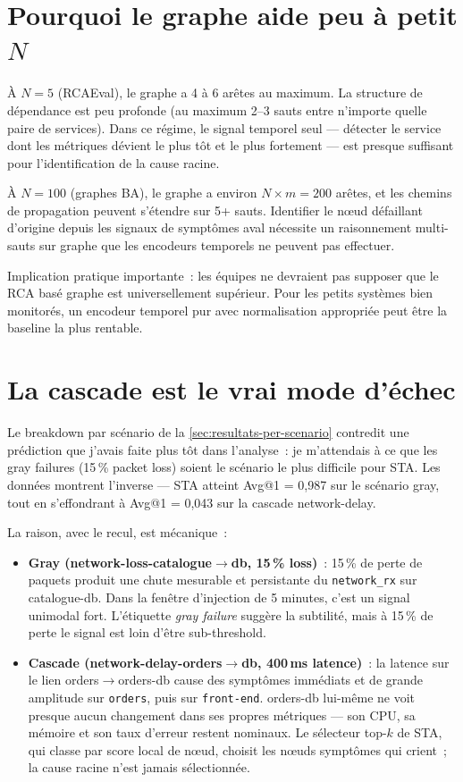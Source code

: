 \documentclass[a4paper,11pt,oneside]{report}
\begin{document}
\section{Pourquoi le graphe aide peu \`a petit $N$}
\label{sec:disc-graphe}

\`A $N{=}5$ (RCAEval), le graphe a 4 \`a 6 ar\^etes au maximum. La structure de d\'ependance est peu profonde (au maximum 2--3 sauts entre n'importe quelle paire de services). Dans ce r\'egime, le signal temporel seul --- d\'etecter le service dont les m\'etriques d\'evient le plus t\^ot et le plus fortement --- est presque suffisant pour l'identification de la cause racine.

\`A $N{=}100$ (graphes BA), le graphe a environ $N \times m = 200$ ar\^etes, et les chemins de propagation peuvent s'\'etendre sur 5+ sauts. Identifier le nœud d\'efaillant d'origine depuis les signaux de sympt\^omes aval n\'ecessite un raisonnement multi-sauts sur graphe que les encodeurs temporels ne peuvent pas effectuer.

Implication pratique importante~: les \'equipes ne devraient pas supposer que le RCA bas\'e graphe est universellement sup\'erieur. Pour les petits syst\`emes bien monitor\'es, un encodeur temporel pur avec normalisation appropri\'ee peut \^etre la baseline la plus rentable.

\section{La cascade est le vrai mode d'\'echec}
\label{sec:disc-cascade}

Le breakdown par sc\'enario de la \cref{sec:resultats-per-scenario} contredit une pr\'ediction que j'avais faite plus t\^ot dans l'analyse~: je m'attendais \`a ce que les gray failures (15\,\% packet loss) soient le sc\'enario le plus difficile pour STA. Les donn\'ees montrent l'inverse --- STA atteint Avg@1 = 0{,}987 sur le sc\'enario gray, tout en s'effondrant \`a Avg@1 = 0{,}043 sur la cascade network-delay.

La raison, avec le recul, est m\'ecanique~:
\begin{itemize}
  \item \textbf{Gray (network-loss-catalogue$\to$db, 15\,\% loss)}~: 15\,\% de perte de paquets produit une chute mesurable et persistante du \texttt{network\_rx} sur catalogue-db. Dans la fen\^etre d'injection de 5 minutes, c'est un signal unimodal fort. L'\'etiquette \emph{gray failure} sugg\`ere la subtilit\'e, mais \`a 15\,\% de perte le signal est loin d'\^etre sub-threshold.
  \item \textbf{Cascade (network-delay-orders$\to$db, 400\,ms latence)}~: la latence sur le lien orders$\to$orders-db cause des sympt\^omes imm\'ediats et de grande amplitude sur \texttt{orders}, puis sur \texttt{front-end}. orders-db lui-m\^eme ne voit presque aucun changement dans ses propres m\'etriques --- son CPU, sa m\'emoire et son taux d'erreur restent nominaux. Le s\'electeur top-$k$ de STA, qui classe par score local de nœud, choisit les nœuds sympt\^omes qui crient~; la cause racine n'est jamais s\'electionn\'ee.
\end{itemize}
\end{document}
